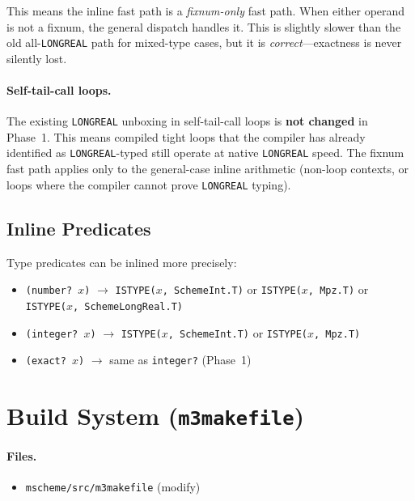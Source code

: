 \documentclass[12pt]{article}
\begin{document}
This means the inline fast path is a \emph{fixnum-only} fast
path.  When either operand is not a fixnum, the general dispatch
handles it.  This is slightly slower than the old all-{\tt LONGREAL}
path for mixed-type cases, but it is \emph{correct}---exactness
is never silently lost.

\paragraph{Self-tail-call loops.}
The existing {\tt LONGREAL} unboxing in self-tail-call
loops is \textbf{not changed} in Phase~1.  This means compiled
tight loops that the compiler has already identified as
{\tt LONGREAL}-typed still operate at native {\tt LONGREAL} speed.
The fixnum fast path applies only to the general-case inline
arithmetic (non-loop contexts, or loops where the compiler
cannot prove {\tt LONGREAL} typing).

\subsection{Inline Predicates}

Type predicates can be inlined more precisely:
\begin{itemize}[nosep]
\item {\tt (number?\ $x$)} $\to$ {\tt ISTYPE($x$, SchemeInt.T)} or
  {\tt ISTYPE($x$, Mpz.T)} or\\
  {\tt ISTYPE($x$, SchemeLongReal.T)}
\item {\tt (integer?\ $x$)} $\to$ {\tt ISTYPE($x$, SchemeInt.T)} or
  {\tt ISTYPE($x$, Mpz.T)}
\item {\tt (exact?\ $x$)} $\to$ same as {\tt integer?} (Phase~1)
\end{itemize}

\section{Build System ({\tt m3makefile})}
\label{sec:impl-buildsys}

\paragraph{Files.}
\begin{itemize}[nosep]
\item {\tt mscheme/src/m3makefile} (modify)
\end{itemize}
\end{document}
